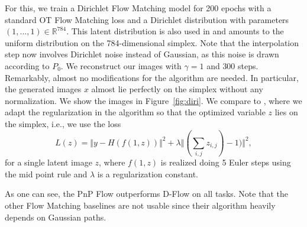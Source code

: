 \documentclass{article} %
\theoremstyle{definition}
\begin{document}
For this, we train a Dirichlet Flow Matching model for 200 epochs with a standard OT Flow Matching loss and a Dirichlet distribution with parameters $(1,...,1) \in \mathbb{R}^{784}$. This latent distribution is also used in \citet{stark2024dirichlet} and amounts to the uniform distribution on the 784-dimensional simplex. Note that the interpolation step now involves Dirichlet noise instead of Gaussian, as this noise is drawn according to $P_0$. We reconstruct our images with $\gamma =1$ and $300$ steps. Remarkably, almost no modifications for the algorithm are needed. In particular, the generated images $x$ almost lie perfectly on the simplex without any normalization. We show the images in Figure~\ref{fig:diri}.  We compare to \citep{ben2024dflow}, where we adapt the regularization in the algorithm so that the optimized variable $z$ lies on the simplex, i.e., we use the loss 
$$L(z) = \Vert y - H(f(1,z)) \Vert^2 + \lambda \Vert (\sum_{i,j} z_{i,j})-1) \Vert^2,$$
for a single latent image $z$, where $f(1,z)$ is realized doing 5 Euler steps using the mid point rule and $\lambda$ is a regularization constant. 

As one can see, the PnP Flow outperforms D-Flow on all tasks. Note that the other Flow Matching baselines \citep{pokle2024trainingfree, zhang2024flow} are not usable since their algorithm heavily depends on Gaussian paths. 
\end{document}
